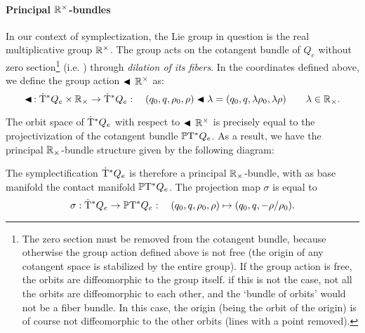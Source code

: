 \paragraph{Principal \texorpdfstring{\(\mathbb{R}^\times\)}{R}-bundles} In our context of symplectization, the Lie group in question is the real multiplicative group \(\mathbb{R}^\times\). The group acts on the cotangent bundle of \(Q_e\) without zero section\footnote
{
    The zero section must be removed from the cotangent bundle, because otherwise the group action defined above is not free (the origin of any cotangent space is stabilized by the entire group). If the group action is free, the orbits are diffeomorphic to the group itself. if this is not the case, not all the orbits are diffeomorphic to each other, and the `bundle of orbits' would not be a fiber bundle. In this case, the origin (being the orbit of the origin) is of course not diffeomorphic to the other orbits (lines with a point removed).
}
(i.e. ) through \emph{dilation of its fibers}. In the coordinates defined above, we define the group action \(\blacktriangleleft\,\mathbb{R}^\times\) as:
\begin{equation}
     \blacktriangleleft\,: \mathrm{\dot{T}}^*Q_e\times\mathbb{R}_{\times} \to \mathrm{\dot{T}}^*Q_e : \quad (q_0, q, \rho_0, \rho) \blacktriangleleft \lambda = (q_0, q, \lambda \rho_0, \lambda \rho ) \qquad \lambda \in \mathbb{R}_{\times}.
\end{equation}

The orbit space of \(\mathrm{\dot{T}}^*Q_e\) with respect to \(\blacktriangleleft\,\mathbb{R}^\times\) is precisely equal to the projectivization of the cotangent bundle \(\mathbb{P}\mathrm{T}^* Q_e\). As a result, we have the principal \(\mathbb{R}_{\times}\)-bundle structure given by the following diagram:
\begin{center}
\end{center}

The symplectification \(\mathrm{\dot{T}}^*Q_e\) is therefore a principal \(\mathbb{R}_{\times}\)-bundle, with as base manifold the contact manifold \(\mathbb{P}\mathrm{T}^* Q_e\). The projection map \(\sigma\) is equal to
\begin{equation}
     \sigma: \mathrm{\dot{T}}^*Q_e \to \mathbb{P}\mathrm{T}^* Q_e: \quad (q_0, q, \rho_0, \rho) \mapsto (q_0, q, -\rho/\rho_0).
\end{equation}

